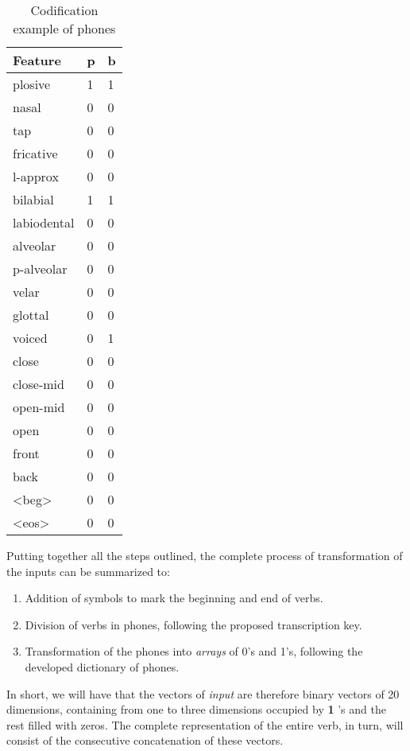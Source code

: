 \begin{table}[H]
\begin{center}
\begin{tabular}{lll}
\textbf{ Feature} & \textbf{p} &\textbf{ b} \\
 \toprule
plosive & 1 & 1 \\
nasal & 0 & 0 \\
tap & 0 & 0 \\
fricative & 0 & 0 \\
l-approx & 0 & 0 \\
bilabial & 1 & 1 \\
labiodental & 0 & 0 \\
alveolar & 0 & 0 \\
p-alveolar & 0 & 0 \\
velar & 0 & 0 \\
glottal & 0 & 0 \\
voiced & 0 & 1 \\
close & 0 & 0 \\
close-mid & 0 & 0 \\
open-mid & 0 & 0 \\
open & 0 & 0 \\
front & 0 & 0 \\
back & 0 & 0 \\
<beg> & 0 & 0 \\
<eos> & 0 & 0
\end{tabular}
\end{center}
\caption{Codification example of phones}
\label{tab:coding_example}
\end{table}

Putting together all the steps outlined, the complete process of transformation of the inputs can be summarized to:

\begin{enumerate}
     \item Addition of symbols to mark the beginning and end of verbs.
     \item Division of verbs in phones, following the proposed transcription key.
     \item Transformation of the phones into \textit{arrays} of 0's and 1's, following the developed dictionary of phones.
\end{enumerate}

In short, we will have that the vectors of \textit{input} are therefore binary vectors of 20 dimensions, containing from one to three dimensions occupied by \textbf{1} 's and the rest filled with zeros. The complete representation of the entire verb, in turn, will consist of the consecutive concatenation of these vectors.






